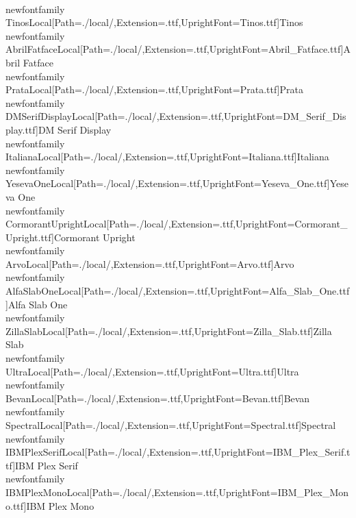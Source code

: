 \\newfontfamily\\TinosLocal[Path=./local/,Extension=.ttf,UprightFont={Tinos.ttf}]{Tinos}
\\newfontfamily\\AbrilFatfaceLocal[Path=./local/,Extension=.ttf,UprightFont={Abril_Fatface.ttf}]{Abril Fatface}
\\newfontfamily\\PrataLocal[Path=./local/,Extension=.ttf,UprightFont={Prata.ttf}]{Prata}
\\newfontfamily\\DMSerifDisplayLocal[Path=./local/,Extension=.ttf,UprightFont={DM_Serif_Display.ttf}]{DM Serif Display}
\\newfontfamily\\ItalianaLocal[Path=./local/,Extension=.ttf,UprightFont={Italiana.ttf}]{Italiana}
\\newfontfamily\\YesevaOneLocal[Path=./local/,Extension=.ttf,UprightFont={Yeseva_One.ttf}]{Yeseva One}
\\newfontfamily\\CormorantUprightLocal[Path=./local/,Extension=.ttf,UprightFont={Cormorant_Upright.ttf}]{Cormorant Upright}
\\newfontfamily\\ArvoLocal[Path=./local/,Extension=.ttf,UprightFont={Arvo.ttf}]{Arvo}
\\newfontfamily\\AlfaSlabOneLocal[Path=./local/,Extension=.ttf,UprightFont={Alfa_Slab_One.ttf}]{Alfa Slab One}
\\newfontfamily\\ZillaSlabLocal[Path=./local/,Extension=.ttf,UprightFont={Zilla_Slab.ttf}]{Zilla Slab}
\\newfontfamily\\UltraLocal[Path=./local/,Extension=.ttf,UprightFont={Ultra.ttf}]{Ultra}
\\newfontfamily\\BevanLocal[Path=./local/,Extension=.ttf,UprightFont={Bevan.ttf}]{Bevan}
\\newfontfamily\\SpectralLocal[Path=./local/,Extension=.ttf,UprightFont={Spectral.ttf}]{Spectral}
\\newfontfamily\\IBMPlexSerifLocal[Path=./local/,Extension=.ttf,UprightFont={IBM_Plex_Serif.ttf}]{IBM Plex Serif}
\\newfontfamily\\IBMPlexMonoLocal[Path=./local/,Extension=.ttf,UprightFont={IBM_Plex_Mono.ttf}]{IBM Plex Mono}
